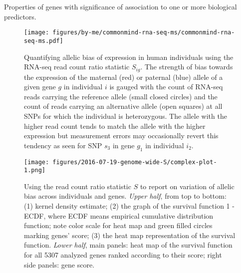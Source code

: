 \documentclass[12pt,letterpaper]{article}
\begin{document}
\begin{table}[h]
\footnotesize

\caption{
Properties of genes with significance of association to one or more biological predictors.
}
\label{tab:signif-gene-effects}
\end{table}

\begin{figure}[h]
\begin{center}
\texttt{[image: figures/by-me/commonmind-rna-seq-ms/commonmind-rna-seq-ms.pdf]}
\end{center}
\caption{ Quantifying allelic bias of expression in human
individuals using the RNA-seq read count ratio statistic \(S_{ig}\).  The strength of
bias towards the expression of the maternal (red) or paternal (blue) allele of
a given gene \(g\) in individual \(i\) is gauged with the count of RNA-seq
reads carrying the reference allele (small closed circles) and the count of
reads carrying an alternative allele (open squares) at all SNPs for which the
individual is heterozygous.  The allele with the higher read count tends to
match the allele with the higher expression but measurement errors may
occasionally revert this tendency as seen for SNP \(s_3\) in gene \(g_1\) in
individual \(i_2\).
}
\label{fig:study-design}
\end{figure}

\begin{figure}[h]
\begin{center}
\texttt{[image: figures/2016-07-19-genome-wide-S/complex-plot-1.png]}
\end{center}
\caption{
Using the read count ratio statistic \(S\) to report on variation of allelic
bias across individuals and genes.  \emph{Upper half}, from top to bottom: (1)
kernel density estimate; (2) the graph of the survival function 1 - ECDF,
where ECDF means empirical cumulative distribution function; note color scale
for heat map and green filled circles marking genes' score; (3) the heat map
representation of the survival function.  \emph{Lower half}, main panels: heat
map of the survival function for all 5307 analyzed genes ranked according to
their score; right side panels: gene score.
}
\label{fig:ranking-genes}
\end{figure}
\end{document}
